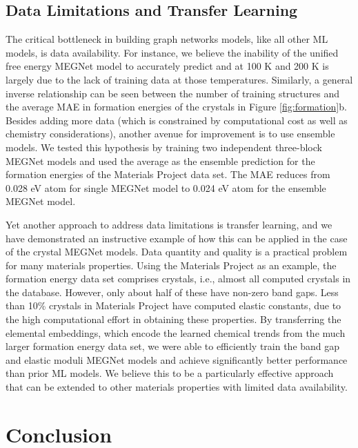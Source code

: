 \documentclass[manuscript=article]{achemso}
\begin{document}
\subsection{Data Limitations and Transfer Learning}

The critical bottleneck in building graph networks models, like all other ML models, is data availability. For instance, we believe the inability of the unified free energy MEGNet model to accurately predict  and  at 100 K and 200 K is largely due to the lack of training data at those temperatures.  Similarly, a general inverse relationship can be seen between the number of training structures and the average MAE in formation energies of the crystals in Figure \ref{fig:formation}b. Besides adding more data (which is constrained by computational cost as well as chemistry considerations), another avenue for improvement is to use ensemble models. We tested this hypothesis by training two independent three-block MEGNet models and used the average as the ensemble prediction for the formation energies of the Materials Project data set. The MAE reduces from 0.028 eV atom for single MEGNet model to 0.024 eV atom for the ensemble MEGNet model.

Yet another approach to address data limitations is transfer learning, and we have demonstrated an instructive example of how this can be applied in the case of the crystal MEGNet models. Data quantity and quality is a practical problem for many materials properties. Using the Materials Project as an example, the formation energy data set comprises  crystals, i.e., almost all computed crystals in the database. However, only about half of these have non-zero band gaps. Less than 10\% crystals in Materials Project have computed elastic constants, due to the high computational effort in obtaining these properties. By transferring the elemental embeddings, which encode the learned chemical trends from the much larger formation energy data set, we were able to efficiently train the band gap and elastic moduli MEGNet models and achieve significantly better performance than prior ML models. We believe this to be a particularly effective approach that can be extended to other materials properties with limited data availability.

\section{Conclusion}
\end{document}
